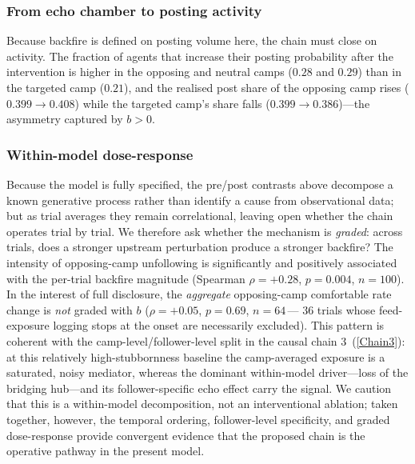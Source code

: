 \documentclass[pdflatex,sn-mathphys-num]{sn-jnl}%
\theoremstyle{thmstyleone}%
\theoremstyle{thmstyletwo}%
\theoremstyle{thmstylethree}%
\begin{document}
\subsubsection{From echo chamber to posting activity}
Because backfire is defined on posting volume here, the chain must close on activity.
The fraction of agents that increase their posting probability after the
intervention is higher in the opposing and neutral camps ($0.28$ and $0.29$) than
in the targeted camp ($0.21$), and the realised post share of the opposing camp
rises ($0.399 \rightarrow 0.408$) while the targeted camp's share falls
($0.399 \rightarrow 0.386$)---the asymmetry captured by $b > 0$.
\par


\subsubsection{Within-model dose-response}
Because the model is fully specified, the pre/post contrasts above decompose a
known generative process rather than identify a cause from observational data;
but as trial averages they remain correlational, leaving open whether the chain
operates trial by trial. We therefore ask whether the mechanism is \emph{graded}:
across trials, does a stronger upstream perturbation produce a stronger backfire?
The intensity of opposing-camp unfollowing is significantly and positively
associated with the per-trial backfire magnitude (Spearman $\rho = +0.28$,
$p = 0.004$, $n = 100$).
In the interest of full disclosure, the \emph{aggregate} opposing-camp comfortable rate
change is \emph{not} graded with $b$ ($\rho = +0.05$, $p = 0.69$, $n = 64$\,---
$36$ trials whose feed-exposure logging stops at the onset are necessarily
excluded). This pattern is coherent with the camp-level/follower-level split in the
causal chain 3~(\ref{Chain3}): at this relatively high-stubbornness baseline the camp-averaged exposure is a
saturated, noisy mediator, whereas the dominant within-model driver---loss of the bridging
hub---and its follower-specific echo effect carry the signal.
We caution that this is a within-model decomposition, not an interventional
ablation; taken together, however, the temporal ordering, follower-level
specificity, and graded dose-response provide convergent evidence that the
proposed chain is the operative pathway in the present model.
\par
\end{document}
